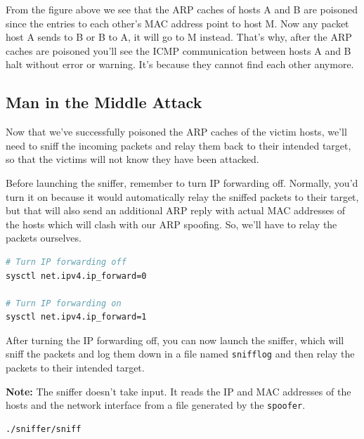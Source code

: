 \documentclass[12pt]{article}
\begin{document}
\vspace{1cm}

From the figure above we see that the ARP caches of hosts A and B are poisoned
since the entries to each other's MAC address point to host M. Now any packet
host A sends to B or B to A, it will go to M instead. That's why, after the ARP
caches are poisoned you'll see the ICMP communication between hosts A and B halt
without error or warning. It's because they cannot find each other anymore.

\vspace{1cm}

\subsection{Man in the Middle Attack}

Now that we've successfully poisoned the ARP caches of the victim hosts, we'll
need to sniff the incoming packets and relay them back to their intended target,
so that the victims will not know they have been attacked.

Before launching the sniffer, remember to turn IP forwarding off. Normally,
you'd turn it on because it would automatically relay the sniffed packets to
their target, but that will also send an additional ARP reply with actual MAC
addresses of the hosts which will clash with our ARP spoofing. So, we'll have to
relay the packets ourselves.

\vspace{1cm}

\begin{lstlisting}[language=bash,caption={Ip fowarding},captionpos=b]
# Turn IP forwarding off
sysctl net.ipv4.ip_forward=0

# Turn IP forwarding on
sysctl net.ipv4.ip_forward=1
\end{lstlisting}

\vspace{1cm}

After turning the IP forwarding off, you can now launch the sniffer, which will
sniff the packets and log them down in a file named \verb|snifflog| and then
relay the packets to their intended target.

{\bf Note:} The sniffer doesn't take input. It reads the IP and MAC addresses of
the hosts and the network interface from a file generated by the \verb|spoofer|.

\vspace{1cm}
\begin{lstlisting}[language=bash,caption={Start sniffing},captionpos=b]
./sniffer/sniff
\end{lstlisting}
\vspace{1cm}
\end{document}
